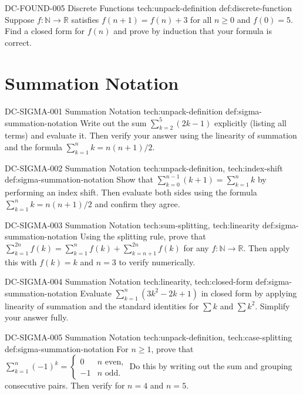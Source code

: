 \exstubgenfull
  {DC-FOUND-005}
  {Discrete Functions}
  {tech:unpack-definition}
  {def:discrete-function}
  {Suppose \(f : \mathbb{N} \to \mathbb{R}\) satisfies \(f(n+1) = f(n) + 3\)
  for all \(n \ge 0\) and \(f(0) = 5\). Find a closed form for \(f(n)\)
  and prove by induction that your formula is correct.}

\section*{Summation Notation}

\exstubgenfull
  {DC-SIGMA-001}
  {Summation Notation}
  {tech:unpack-definition}
  {def:sigma-summation-notation}
  {Write out the sum \(\displaystyle\sum_{k=2}^{5}(2k-1)\) explicitly
  (listing all terms) and evaluate it. Then verify your answer using
  the linearity of summation and the formula \(\sum_{k=1}^{n} k = n(n+1)/2\).}

\exstubgenfull
  {DC-SIGMA-002}
  {Summation Notation}
  {tech:unpack-definition, tech:index-shift}
  {def:sigma-summation-notation}
  {Show that \(\displaystyle\sum_{k=0}^{n-1}(k+1) = \sum_{k=1}^{n} k\)
  by performing an index shift. Then evaluate both sides using the formula
  \(\sum_{k=1}^{n} k = n(n+1)/2\) and confirm they agree.}

\exstubgenfull
  {DC-SIGMA-003}
  {Summation Notation}
  {tech:sum-splitting, tech:linearity}
  {def:sigma-summation-notation}
  {Using the splitting rule, prove that
  \(\displaystyle\sum_{k=1}^{2n} f(k) = \sum_{k=1}^{n} f(k) + \sum_{k=n+1}^{2n} f(k)\)
  for any \(f : \mathbb{N} \to \mathbb{R}\). Then apply this with
  \(f(k) = k\) and \(n = 3\) to verify numerically.}

\exstubgenfull
  {DC-SIGMA-004}
  {Summation Notation}
  {tech:linearity, tech:closed-form}
  {def:sigma-summation-notation}
  {Evaluate \(\displaystyle\sum_{k=1}^{n}(3k^2 - 2k + 1)\) in closed form
  by applying linearity of summation and the standard identities for
  \(\sum k\) and \(\sum k^2\). Simplify your answer fully.}

\exstubgenfull
  {DC-SIGMA-005}
  {Summation Notation}
  {tech:unpack-definition, tech:case-splitting}
  {def:sigma-summation-notation}
  {For \(n \ge 1\), prove that
  \(\displaystyle\sum_{k=1}^{n}(-1)^k =
  \begin{cases} 0 & n \text{ even,} \\ -1 & n \text{ odd.} \end{cases}\)
  Do this by writing out the sum and grouping consecutive pairs.
  Then verify for \(n = 4\) and \(n = 5\).}

